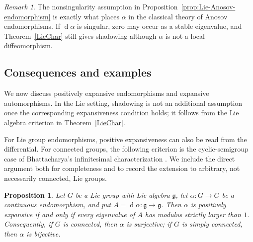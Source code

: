 \documentclass[12pt]{amsart}
\newtheorem{proposition}[theorem]{Proposition}
\theoremstyle{definition}
\numberwithin{equation}{section}
\theoremstyle{remark}
\newtheorem{remark}[theorem]{Remark}
\DeclareMathOperator{\di}{d}
\begin{document}
\begin{remark}
The nonsingularity assumption in Proposition~\ref{prop:Lie-Anosov-endomorphism}
is exactly what places $\alpha$ in the classical theory of Anosov
endomorphisms. If $\di\alpha$ is singular, zero may occur as a stable
eigenvalue, and Theorem~\ref{LieChar} still gives shadowing although
$\alpha$ is not a local diffeomorphism.
\end{remark}


\subsection{Consequences and examples}

We now discuss positively expansive endomorphisms and expansive
automorphisms. In the Lie setting, shadowing is not an additional
assumption once the corresponding expansiveness condition holds; it follows
from the Lie algebra criterion in Theorem~\ref{LieChar}.


For Lie group endomorphisms, positive expansiveness can also be read from
the differential. For connected groups, the following criterion is the
cyclic-semigroup case of Bhattacharya's infinitesimal characterization
\cite[Theorem~A and Proposition~2.4]{Bhattacharya2004}. We include the direct
argument both for completeness and to record the extension to arbitrary,
not necessarily connected, Lie groups.

\begin{proposition}\label{PostEx}
Let $G$ be a Lie group with Lie algebra $\mathfrak g$, let
$\alpha:G\to G$ be a continuous endomorphism, and put
$A=\di\alpha:\mathfrak g\to\mathfrak g$. Then $\alpha$ is positively
expansive if and only if every eigenvalue of $A$ has modulus strictly larger
than $1$. Consequently, if $G$ is connected, then $\alpha$ is surjective;
if $G$ is simply connected, then $\alpha$ is bijective.
\end{proposition}
\end{document}
